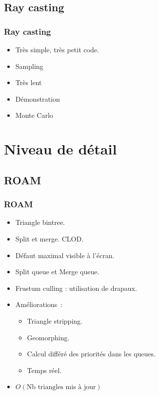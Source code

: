 \documentclass[hyperref={pdfpagelabels=false}]{beamer}
\begin{document}
\subsection{Ray casting}

\begin{frame}
  \frametitle{Ray casting}
  \begin{itemize}
  \item Très simple, très petit code.
  \item Sampling
  \item Très lent
  \item Démonstration
  \item Monte Carlo
  \end{itemize}
\end{frame}

\section[LOD]{Niveau de détail}

\subsection{ROAM}
\begin{frame}
  \frametitle{ROAM}
  \begin{itemize}
  \item Triangle bintree.
  \item Split et merge. CLOD.
  \item Défaut maximal visible à l'écran.
  \item Split queue et Merge queue.
  \item Frustum culling : utilisation de drapaux.
  \item Améliorations~:
    \begin{itemize}
    \item Triangle stripping.
    \item Geomorphing.
    \item Calcul différé des priorités dans les queues.
    \item Temps réel.
    \end{itemize}
  \item $O(\text{Nb triangles mis à jour})$
  \end{itemize}
\end{frame}
\end{document}
